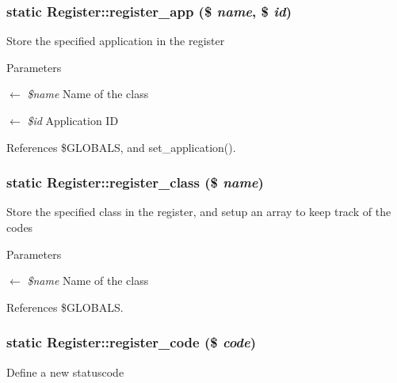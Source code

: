 \subsubsection[{register\_\-app}]{\setlength{\rightskip}{0pt plus 5cm}static Register::register\_\-app (\$ {\em name}, \/  \$ {\em id})}\label{classRegister_ac547568c4a7272fdaf65cb2825eccec3}
Store the specified application in the register


\begin{DoxyParams}{Parameters}
\item[\mbox{$\leftarrow$} {\em \$name}]Name of the class \item[\mbox{$\leftarrow$} {\em \$id}]Application ID \end{DoxyParams}


References \$GLOBALS, and set\_\-application().

\subsubsection[{register\_\-class}]{\setlength{\rightskip}{0pt plus 5cm}static Register::register\_\-class (\$ {\em name})}\label{classRegister_a58300f74d002f1306a03baf12af0f02c}
Store the specified class in the register, and setup an array to keep track of the codes


\begin{DoxyParams}{Parameters}
\item[\mbox{$\leftarrow$} {\em \$name}]Name of the class \end{DoxyParams}


References \$GLOBALS.

\subsubsection[{register\_\-code}]{\setlength{\rightskip}{0pt plus 5cm}static Register::register\_\-code (\$ {\em code})}\label{classRegister_a875fd1f32f0746aa9e0e00b053c7389a}
Define a new statuscode


